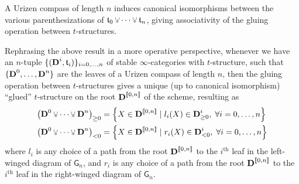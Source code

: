 \begin{theorem}
 \label{northern}
A Urizen compass of length $n$ induces canonical isomorphisms between the various parenthesizations of $\tee_0\glue \cdots\glue \tee_n$, giving associativity of the gluing operation between $t$\hyp{}structures.
 \end{theorem}
Rephrasing the above result in a more operative perspective, whenever we have an $n$\hyp{}tuple $\{(\textbf{D}^i,\mathfrak{t}_i)\}_{i=0,\dots, n}$ of stable $\infty$\hyp{}categories with $t$\hyp{}structure, such that $\{\textbf{D}^0,\dots, \textbf{D}^n\}$ are the leaves of a Urizen compass of length $n$, then the gluing operation between $t$\hyp{}structures gives a unique (up to canonical isomorphism) ``glued'' $t$\hyp{}structure on the root $\textbf{D}^{\llbracket 0,n\rrbracket}$ of the scheme, resulting as
\begin{align}
	\big( \D^0\glue \cdots \glue \D^n\big)_{\ge 0} &=
	\Big\{
	  X\in \D^{\llbracket 0,n\rrbracket} \mid l_i(X)\in \D^i_{\ge 0}, \hspace{1mm} \forall i=0,\dots,n
	\Big\}\notag \\ 
	\big( \D^0\glue \cdots \glue \D^n\big)_{< 0} &=
	\Big\{
	  X\in \D^{\llbracket 0,n\rrbracket}  \mid r_i(X)\in \D^i_{< 0}, \hspace{1mm} \forall i=0,\dots,n
	\Big\}
\end{align}
where $l_i$ is any choice of a path from the root $\textbf{D}^{\llbracket 0,n\rrbracket}$ to the $i^\text{th}$ leaf in the left\hyp{}winged diagram of $\mathsf{G}_n$, and $r_i$ is any choice of a path from the root $\textbf{D}^{\llbracket 0,n\rrbracket}$ to the $i^\text{th}$ leaf in the right\hyp{}winged diagram of $\mathsf{G}_n$.
